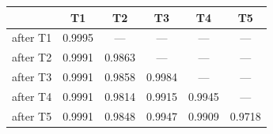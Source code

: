 \begin{tabular}{@{}lccccc@{}}
\toprule
& \textbf{T1} & \textbf{T2} & \textbf{T3} & \textbf{T4} & \textbf{T5} \\
\midrule
after T1 & 0.9995 & --- & --- & --- & --- \\
after T2 & 0.9991 & 0.9863 & --- & --- & --- \\
after T3 & 0.9991 & 0.9858 & 0.9984 & --- & --- \\
after T4 & 0.9991 & 0.9814 & 0.9915 & 0.9945 & --- \\
after T5 & 0.9991 & 0.9848 & 0.9947 & 0.9909 & 0.9718 \\
\bottomrule
\end{tabular}
